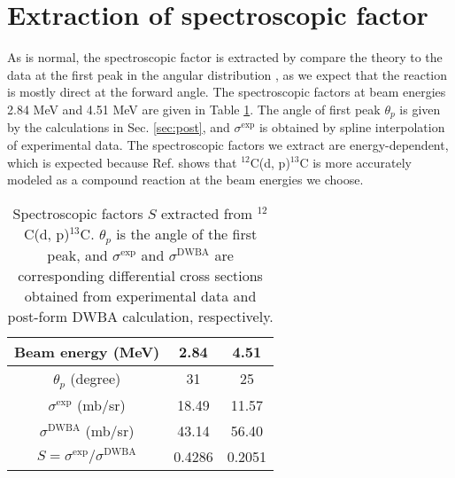 \section{Extraction of spectroscopic factor}
As is normal, the spectroscopic factor is extracted by compare the theory to the data at the first peak in the angular distribution
\cite{PhysRevC.69.064313}, as we expect that the reaction is mostly direct at the forward angle. 
The spectroscopic factors at beam energies 2.84 MeV and 4.51 MeV are given in Table \ref{tab:spec}. 
The angle of first peak $\theta_{p}$ is given by the calculations in Sec. \ref{sec:post}, 
and $\sigma^{\mathrm{exp}}$ is obtained by spline interpolation of experimental data. 
The spectroscopic factors we extract are energy-dependent, 
which is expected because Ref. \cite{PhysRev.101.209} shows that $^{12}$C(d, p)$^{13}$C is more accurately modeled as a compound reaction at the beam energies we choose. 
\begin{table}[bt]
	\centering
	\caption{Spectroscopic factors $S$ extracted from $^{12}$C(d, p)$^{13}$C. 
	$\theta_p$ is the angle of the first peak, and $\sigma^{\mathrm{exp}}$ and $\sigma^{\mathrm{DWBA}}$ are corresponding differential cross sections obtained from experimental data and post-form DWBA calculation, respectively. }
	\label{tab:spec}
	\begin{tabular}{ccc}
		\hline
		\hline
		Beam energy (MeV)                  & 2.84 & 4.51 \\
		\hline
		$\theta_p$ (degree)                &  31 & 25 \\
		$\sigma^{\mathrm{exp}}$ (mb/sr)    &  18.49 & 11.57 \\
		$\sigma^{\mathrm{DWBA}}$ (mb/sr)   &  43.14 & 56.40 \\
		$S=\sigma^{\mathrm{exp}}/\sigma^{\mathrm{DWBA}}$ & 0.4286  & 0.2051 \\
		\hline
		\hline
	\end{tabular}
\end{table}